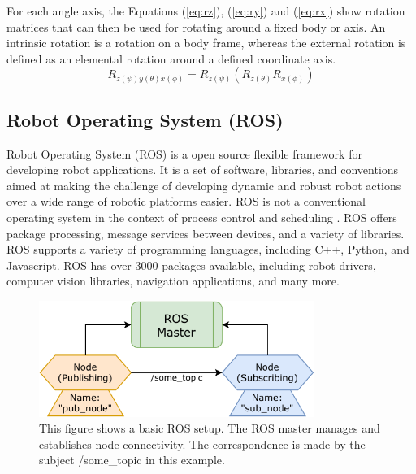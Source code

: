 For each angle axis, the Equations (\ref{eq:rz}), (\ref{eq:ry}) and (\ref{eq:rx})  show rotation matrices that can then be used for rotating around a fixed body or axis. An intrinsic rotation is a rotation on a body frame, whereas the external rotation is defined as an elemental rotation around a defined coordinate axis.
\begin{equation}
    R_{z(\psi)y(\theta)x(\phi)} = R_{z(\psi)} (R_{z(\theta)}R_{x(\phi)})
\end{equation}


\subsection{Robot Operating System (ROS)}
Robot Operating System (ROS) is a open source flexible framework for developing robot applications. It is a set of software, libraries, and conventions aimed at making the challenge of developing dynamic and robust robot actions over a wide range of robotic platforms easier. ROS is not a conventional operating system in the context of process control and scheduling \cite{quigley_ros_2009}. ROS offers package processing, message services between devices, and a variety of libraries. ROS supports a variety of programming languages, including C++, Python, and Javascript. ROS has over 3000 packages available, including robot drivers, computer vision libraries, navigation applications, and many more.

\begin{figure}[h]%
    \centering
    \includegraphics[width=0.8\textwidth]{graphics/rosmaster.pdf}
    \caption{This figure shows a basic ROS setup. The ROS master manages and establishes node connectivity. The correspondence is made by the subject /some\_topic in this example.}
    \label{fig:rosmaster}
\end{figure}

